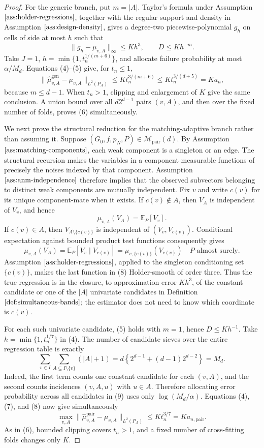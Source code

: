 \documentclass{article}
\begin{document}
\begin{proof}
For the generic branch, put \(m=|A|\). Taylor's formula under Assumption \(\ref{ass:holder-regressions}\), together with the regular support and density in Assumption \(\ref{ass:design-density}\), gives a degree-two piecewise-polynomial \(g_h\) on cells of side at most \(h\) such that
\[
 \lVert g_h-\mu_{v,A}\rVert_\infty\le K h^3,
 \qquad D\le K h^{-m}. \tag{5}
\]
Take \(J=1\), \(h=\min\{1,t_n^{1/(m+6)}\}\), and allocate failure probability at most \(\alpha/M_d\). Equations (4)--(5) give, for \(t_n\le1\),
\[
 \lVert\widehat\mu^{\mathrm{gen}}_{v,A}-\mu_{v,A}\rVert_{L^2(P_A)}
 \le K t_n^{3/(m+6)}
 \le K t_n^{3/(d+5)}=K a_n, \tag{6}
\]
because \(m\le d-1\). When \(t_n>1\), clipping and enlargement of \(K\) give the same conclusion. A union bound over all \(d2^{d-1}\) pairs \((v,A)\), and then over the fixed number of folds, proves (6) simultaneously.

We next prove the structural reduction for the matching-adaptive branch rather than assuming it. Suppose \((G_0,f,p_N,P)\in\mathcal M_{\mathrm{pair}}(d)\). By Assumption \(\ref{ass:matching-components}\), each weak component is a singleton or an edge. The structural recursion makes the variables in a component measurable functions of precisely the noises indexed by that component. Assumption \(\ref{ass:anm-independence}\) therefore implies that the observed subvectors belonging to distinct weak components are mutually independent. Fix \(v\) and write \(c(v)\) for its unique component-mate when it exists. If \(c(v)\notin A\), then \(V_A\) is independent of \(V_v\), and hence
\[
 \mu_{v,A}(V_A)=\mathbb E_P[V_v]. \tag{7}
\]
If \(c(v)\in A\), then \(V_{A\setminus\{c(v)\}}\) is independent of \((V_v,V_{c(v)})\). Conditional expectation against bounded product test functions consequently gives
\[
 \mu_{v,A}(V_A)
 =\mathbb E_P[V_v\mid V_{c(v)}]
 =\mu_{v,\{c(v)\}}(V_{c(v)})
 \quad P\text{-almost surely}. \tag{8}
\]
Assumption \(\ref{ass:holder-regressions}\), applied to the singleton conditioning set \(\{c(v)\}\), makes the last function in (8) Holder-smooth of order three. Thus the true regression is in the closure, to approximation error \(K h^3\), of the constant candidate or one of the \(|A|\) univariate candidates in Definition \(\ref{def:simultaneous-bands}\); the estimator does not need to know which coordinate is \(c(v)\).

For each such univariate candidate, (5) holds with \(m=1\), hence \(D\le K h^{-1}\). Take \(h=\min\{1,t_n^{1/7}\}\) in (4). The number of candidate sieves over the entire regression table is exactly
\[
 \sum_{v\in I}\sum_{A\subseteq I\setminus\{v\}}(|A|+1)
 =d\left\{2^{d-1}+(d-1)2^{d-2}\right\}=M_d. \tag{9}
\]
Indeed, the first term counts one constant candidate for each \((v,A)\), and the second counts incidences \((v,A,u)\) with \(u\in A\). Therefore allocating error probability across all candidates in (9) uses only \(\log(M_d/\alpha)\). Equations (4), (7), and (8) now give simultaneously
\[
 \max_{v,A}
 \lVert\widehat\mu^{\mathrm{pair}}_{v,A}-\mu_{v,A}\rVert_{L^2(P_A)}
 \le K t_n^{3/7}=K a_{n,\mathrm{pair}}. \tag{10}
\]
As in (6), bounded clipping covers \(t_n>1\), and a fixed number of cross-fitting folds changes only \(K\).


\end{proof}
\end{document}
